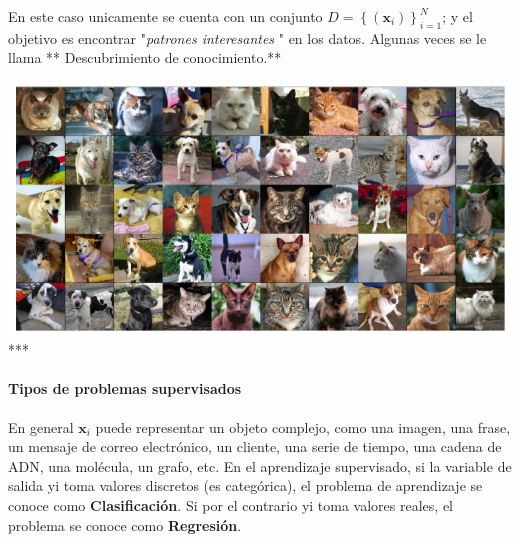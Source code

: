\documentclass[11pt]{article}
\makeatletter
\def\maxwidth{\ifdim\Gin@nat@width>\linewidth\linewidth
    \else\Gin@nat@width\fi}
\let\Oldincludegraphics\includegraphics
\renewcommand{\includegraphics}[1]{\Oldincludegraphics[width=.8\maxwidth]{#1}}
\makeatother
\begin{document}
    En este caso unicamente se cuenta con un conjunto
\(\mathit{D} = \left \{ \left ( \mathbf{x}_{i} \right ) \right \} _{i=1}^{N}\);
y el objetivo es encontrar "\emph{patrones interesantes} " en los datos.
Algunas veces se le llama ** Descubrimiento de conocimiento.**

    \includegraphics{./Images/Unsupervised.png} ***

    \paragraph{\texorpdfstring{\textbf{Tipos de problemas
supervisados}}{Tipos de problemas supervisados}}\label{tipos-de-problemas-supervisados}

    En general \(\mathbf{x}_{i}\) puede representar un objeto complejo, como
una imagen, una frase, un mensaje de correo electrónico, un cliente, una
serie de tiempo, una cadena de ADN, una molécula, un grafo, etc. En el
aprendizaje supervisado, si la variable de salida yi toma valores
discretos (es categórica), el problema de aprendizaje se conoce como
\textbf{Clasificación}. Si por el contrario yi toma valores reales, el
problema se conoce como \textbf{Regresión}.
\end{document}
